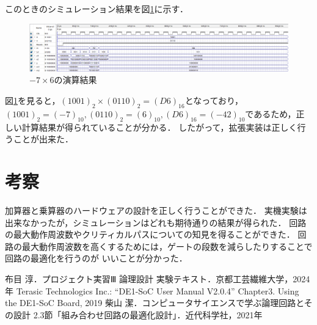 \documentclass{jlreq}
\numberwithin{equation}{section}
\begin{document}
このときのシミュレーション結果を図\ref{fig:multi_ex_X-7_Y6}に示す．
\begin{figure}[H]
  \centering
  \includegraphics[width=\textwidth]{assets/multi_ex_X-7_Y6.png}
  \caption{$-7 \times 6$の演算結果}
  \label{fig:multi_ex_X-7_Y6}
\end{figure}
図\ref{fig:multi_ex_X-7_Y6}を見ると，$(1001)_2 \times (0110)_2 = (D6)_{16}$となっており，
$(1001)_2 = (-7)_{10}, (0110)_2 = (6)_{10}, (D6)_{16} = (-42)_{10}$であるため，正しい計算結果が得られていることが分かる．
したがって，拡張実装は正しく行うことが出来た．

\section{考察}
加算器と乗算器のハードウェアの設計を正しく行うことができた．
実機実験は出来なかったが，シミュレーションはどれも期待通りの結果が得られた．
回路の最大動作周波数やクリティカルパスについての知見を得ることができた．
回路の最大動作周波数を高くするためには，ゲートの段数を減らしたりすることで回路の最適化を行うのが
いいことが分かった．

\begin{thebibliography}{9}
   布目 淳．プロジェクト実習Ⅲ 論理設計 実験テキスト．京都工芸繊維大学，2024年
   Terasic Technologics Inc.:  ``DE1-SoC User Manual V2.0.4'' Chapter3. Using the DE1-SoC Board, 2019
   柴山 潔．コンピュータサイエンスで学ぶ論理回路とその設計 2.3節「組み合わせ回路の最適化設計」．近代科学社，2021年
\end{thebibliography}
\end{document}
